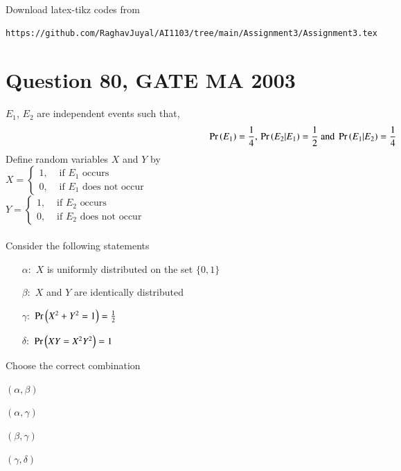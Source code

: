 \documentclass[journal,12pt,twocolumn]{IEEEtran}
\begin{document}
%
Download latex-tikz codes from 
%
\begin{lstlisting}
https://github.com/RaghavJuyal/AI1103/tree/main/Assignment3/Assignment3.tex
\end{lstlisting}
\section*{Question 80, GATE MA 2003}
$E_1$, $E_2$ are independent events such that,
\begin{align*}
    \Pr\left(E_1\right) = \frac{1}{4},\,\Pr\left(E_2|E_1\right) = \frac{1}{2} \text{ and } \Pr\left(E_1|E_2\right) = \frac{1}{4}
\end{align*}
Define random variables $X$ and $Y$ by\\
$X=
\begin{cases}
1, &\text{ if $E_1$ occurs}\\
0, &\text{ if $E_1$ does not occur}
\end{cases}$
\\$Y=
\begin{cases}
1, &\text{ if $E_2$ occurs}\\
0, &\text{ if $E_2$ does not occur}
\end{cases}$
\\\\
Consider the following statements
\begin{itemize}
    \item[$\alpha:$]$X$ is uniformly distributed on the set $\{0,1\}$
    \item[$\beta:$]$X$ and $Y$ are identically distributed
    \item[$\gamma:$]$\Pr\left(X^2 + Y^2 = 1\right) = \frac{1}{2}$
    \item[$\delta:$]$\Pr\left(XY=X^2Y^2\right) = 1$
\end{itemize}
Choose the correct combination
\begin{enumerate}[label = (\alph*)]
\begin{multicols}{2}
\setlength\itemsep{2em}
    \item $(\alpha,\beta)$
    \item $(\alpha,\gamma)$
    \item $(\beta,\gamma)$
    \item $(\gamma,\delta)$
\end{multicols}
\end{enumerate}
\end{document}
